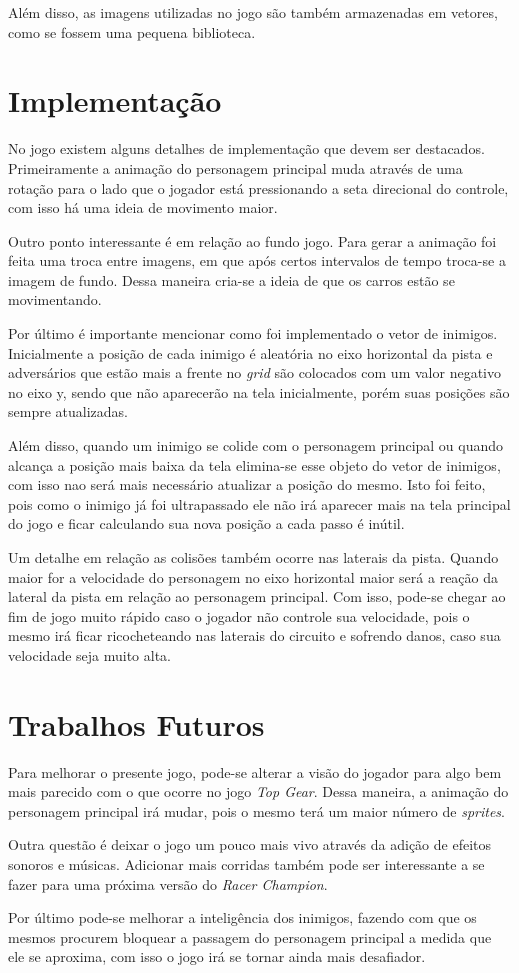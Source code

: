 Além disso, as imagens utilizadas no jogo são também armazenadas em vetores, como se fossem uma pequena biblioteca.
\newpage

\section{Implementação}

No jogo existem alguns detalhes de implementação que devem ser destacados. Primeiramente a animação do personagem principal muda através de uma rotação para o
lado que o jogador está pressionando a seta direcional do controle, com isso há uma ideia de movimento maior.

Outro ponto interessante é em relação ao fundo jogo. Para gerar a animação foi feita uma troca entre imagens, em que após certos intervalos de tempo troca-se
a imagem de fundo. Dessa maneira cria-se a ideia de que os carros estão se movimentando.

Por último é importante mencionar como foi implementado o vetor de inimigos. Inicialmente a posição de cada inimigo é aleatória no eixo horizontal da pista e
adversários que estão mais a frente no \textit{grid} são colocados com um valor negativo no eixo y, sendo que não aparecerão na tela inicialmente, porém suas
posições são sempre atualizadas.

Além disso, quando um inimigo se colide com o personagem principal ou quando alcança a posição mais baixa da tela elimina-se esse objeto do vetor de inimigos,
com isso nao será mais necessário atualizar a posição do mesmo. Isto foi feito, pois como o inimigo já foi ultrapassado ele não irá aparecer mais na tela principal
do jogo e ficar calculando sua nova posição a cada passo é inútil.

Um detalhe em relação as colisões também ocorre nas laterais da pista. Quando maior for a velocidade do personagem no eixo horizontal maior será a reação da 
lateral da pista em relação ao personagem principal. Com isso, pode-se chegar ao fim de jogo muito rápido caso o jogador não controle sua velocidade, pois
o mesmo irá ficar ricocheteando nas laterais do circuito e sofrendo danos, caso sua velocidade seja muito alta.

\section{Trabalhos Futuros}

Para melhorar o presente jogo, pode-se alterar a visão do jogador para algo bem mais parecido com o que ocorre no jogo \textit{Top Gear}. Dessa maneira, a 
animação do personagem principal irá mudar, pois o mesmo terá um maior número de \textit{sprites}.

Outra questão é deixar o jogo um pouco mais vivo através da adição de efeitos sonoros e músicas. Adicionar mais corridas também pode ser interessante a se fazer
para uma próxima versão do \textit{Racer Champion}.

Por último pode-se melhorar a inteligência dos inimigos, fazendo com que os mesmos procurem bloquear a passagem do personagem principal a medida que ele se 
aproxima, com isso o jogo irá se tornar ainda mais desafiador.